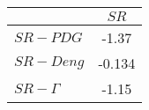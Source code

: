 \begin{tabular}{l|c}
\toprule
{} &   $SR$ \\
\midrule
\textbf{$SR-PDG$   } &  -1.37 \\
\textbf{$SR-Deng$  } & -0.134 \\
\textbf{$SR-\Gamma$} &  -1.15 \\
\bottomrule
\end{tabular}
